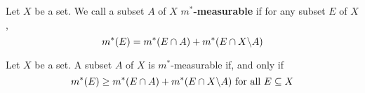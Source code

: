 \begin{definition}
    Let $X$ be a set. We call a subset $A$ of  $X$  \textbf{$m^\ast$-measurable}
    if for any subset $E$ of  $X$,
    \begin{equation}\label{equation_1.5}
        m^\ast(E)=m^\ast(E \cap A)+m^\ast(E \cap X \backslash A)
    \end{equation}
\end{definition}

\begin{lemma}\label{lemma_1.3.2}
    Let $X$ be a set. A subset $A$ of $X$ is  $m^\ast$-measurable if, and only
    if
    \begin{equation*}
        m^\ast(E) \geq m^\ast(E \cap A)+m^\ast(E \cap X \backslash A) \text{ for all }
        E \subseteq X
    \end{equation*}
\end{lemma}

